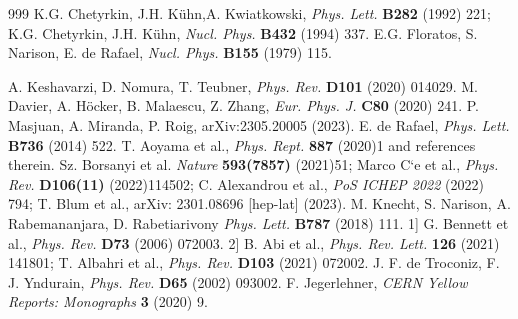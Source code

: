\begin{thebibliography}{999}
 K.G. Chetyrkin, J.H. K\"uhn,A. Kwiatkowski, {\it Phys. Lett.} {\bf B282} (1992) 221; K.G. Chetyrkin, J.H. K\"uhn, {\it Nucl. Phys.} {\bf B432} (1994) 337.
E.G. Floratos, S. Narison, E. de Rafael, {\it Nucl. Phys.} {\bf B155} (1979) 115.

A. Keshavarzi, D. Nomura, T. Teubner, {\it Phys. Rev.} {\bf D101} (2020) 014029.
 M. Davier, A. H\"ocker, B. Malaescu,  Z. Zhang, {\it Eur. Phys. J.} {\bf C80} (2020) 241.
  P. Masjuan, A. Miranda, P. Roig, arXiv:2305.20005 (2023). 
  E. de Rafael, {\it Phys. Lett.} {\bf B736} (2014) 522.
 T. Aoyama et al., {\it  Phys. Rept.} {\bf 887} (2020)1 and references therein.
 Sz. Borsanyi et al. {\it  Nature} {\bf 593(7857)} (2021)51;  Marco C`e et al.,
{\it  Phys. Rev.} {\bf D106(11)} (2022)114502; C. Alexandrou et al., {\it PoS ICHEP 2022} (2022) 794; T. Blum et al., arXiv:  2301.08696 [hep-lat] (2023).
  M. Knecht, S. Narison, A. Rabemananjara, D. Rabetiarivony
 {\it Phys. Lett.} {\bf B787} (2018) 111.
 1] G. Bennett et al., {\it Phys. Rev.} {\bf D73} (2006) 072003.
      2] B. Abi et al., {\it Phys. Rev. Lett.} {\bf 126} (2021) 141801;  T. Albahri et al., {\it Phys. Rev.} {\bf  D103} (2021) 072002.
J. F. de Troconiz, F. J. Yndurain, {\it Phys. Rev.} {\bf D65} (2002) 093002.
 F. Jegerlehner, {\it CERN Yellow Reports: Monographs} {\bf 3} (2020) 9.
\end{thebibliography}



